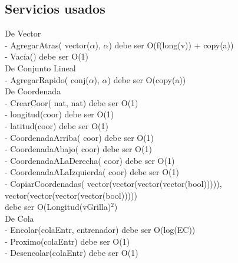 \subsection{Servicios usados} 

De Vector \\
 - AgregarAtras( vector($\alpha$), $\alpha$) debe ser O(f(long(v)) + copy(a))  \\
 - Vac\'ia()  debe ser O(1)  \\

De Conjunto Lineal \\
 - AgregarRapido( conj($\alpha$), $\alpha$) debe ser O(copy(a)) \\

De Coordenada \\ 	
 - CrearCoor( nat,  nat)  debe ser O(1) \\
 - longitud(coor) debe ser O(1) \\
 - latitud(coor) debe ser O(1) \\
 - CoordenadaArriba( coor) debe ser O(1) \\
 - CoordenadaAbajo( coor) debe ser O(1) \\
 - CoordenadaALaDerecha( coor) debe ser O(1) \\
 - CoordenadaALaIzquierda( coor) debe ser O(1) \\
 - CopiarCoordenadas( vector(vector(vector(vector(bool))))), vector(vector(vector(vector(bool))))) \\ debe ser O(Longitud(vGrilla)$^2$) \\

De Cola \\
 - Encolar(colaEntr, entrenador) debe ser O(log(EC)) \\
 - Proximo(colaEntr)  debe ser O(1) \\
 - Desencolar(colaEntr) debe ser O(1) \\